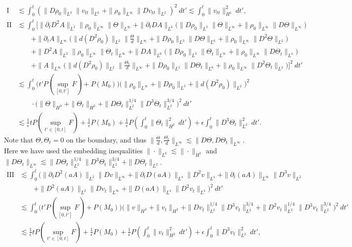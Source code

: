 \documentclass[12pt,a4paper]{amsart}
\numberwithin{equation}{section}
\theoremstyle{plain}
\theoremstyle{definition}
\begin{document}
\begin{align*}
\mathrm{I}&\lesssim \int_{0}^{t} (\|D\rho_0\|_{L^3}\|v_{tt}\|_{L^6}+\|\rho_0\|_{L^{\infty}}\|Dv_{tt}\|_{L^2})^2\ dt' \lesssim  \int_{0}^{t} \|v_{tt}\|_{H^1}^2\ dt',\\
\mathrm{II}&\lesssim \int_{0}^{t} \bigg[\|\partial_t D^2 A\|_{L^2} \|\rho_0\|_{L^{\infty}} \|\Theta\|_{ L^{\infty}}
 +\|\partial_t D A\|_{L^6}\Big(\|D\rho_0\|_{ L^3} \|\Theta\|_{L^{\infty}}+\|\rho_0\|_{L^{\infty}} \|D\Theta\|_{ L^{\infty}}\Big)\\
 &\qquad +\|\partial_t  A\|_{ L^{\infty}}\Big(\|d (D^2\rho_0)\|_{L^2} \|\frac{\Theta}{d}\|_{ L^{\infty}}+\|D\rho_0\|_{L^3} \|D\Theta\|_{L^6}+\|\rho_0\|_{L^{\infty}}\|D^2\Theta\|_{L^2}\Big)\\
&\qquad  +\|D^2A\|_{L^2} \|\rho_0\|_{L^{\infty}} \| \Theta_t\|_{ L^{\infty}}+ \|DA\|_{L^6}\Big( \| D\rho_0\|_{L^3} \|\Theta_t\|_{ L^{\infty}}+\|\rho_0\|_{ L^{\infty}} \|D\Theta_t\|_{ L^4}\Big)\\
&\qquad +\|  A\|_{ L^{\infty}}\Big(\|d (D^2\rho_0)\|_{L^2} \|\frac{\Theta_t}{d}\|_{ L^{\infty}}+\|D\rho_0\|_{L^3} \|D\Theta_t\|_{L^6}+\|\rho_0\|_{L^{\infty}}\|D^2\Theta_t\|_{L^2}\Big)\bigg]^2\ dt'\\
&\lesssim \int_{0}^{t} \Big( t'P(\sup\limits_{[0,t']}F)+P(M_0)  \Big)\Big(\|\rho_0\|_{L^{\infty}}+\|D\rho_0\|_{L^3}+\|d(D^2 \rho_0)\|_{L^2}\Big)^2\\
&\qquad\cdot\Big(\|\Theta\|_{H^3}+\|\Theta_t\|_{H^2}+\|D\Theta_t\|_{L^2}^{1/4}\|D^3\Theta_t\|_{L^2}^{3/4}\Big)^2 \ dt'\\
&\lesssim  \frac{1}{\epsilon}tP(\sup\limits_{t'\in[0,t]}F)+\frac{1}{\epsilon}P(M_0)+\frac{1}{\epsilon}P\left(\int_{0}^{t}\|\Theta_t\|_{H^2}^2 \ dt'\right)+\epsilon \int_{0}^{t}\|D^3\Theta_t\|_{L^2}^2 \ dt'.
\end{align*}
Note that $\Theta, \Theta_t=0$ on the boundary, and thus $\|\frac{\Theta}{d}, \frac{\Theta_t}{d}\|_{ L^{\infty}}\lesssim \|D\Theta, D\Theta_t\|_{ L^{\infty}}$. Here we have used the embedding inequalities $\|\cdot\|_{L^6}\lesssim \|\cdot\|_{H^1}$ and $\| D\Theta_t\|_{ L^{\infty}} \lesssim  \|D\Theta_t\|_{L^2}^{1/4}\|D^3\Theta_t\|_{L^2}^{3/4} +\|D\Theta_t\|_{L^2}$.
\begin{align*}
\mathrm{III}&\lesssim   
\int_{0}^{t}  \Big(\|\partial_t D^2(aA)\|_{L^2}\|Dv\|_{L^{\infty}}
+\|\partial_t D (aA)\|_{L^4}\|D^2 v\|_{L^4}
+\|\partial_t (aA)\|_{L^{\infty}}\|D^3 v\|_{L^2}\\
&\qquad
+\|D^2 (aA)\|_{L^2} \| Dv_t \|_{L^{\infty}}
+\|D(aA)\|_{L^4} \|D^2v_t\|_{L^4}\Big)^2 \ dt'\\
&\lesssim \int_{0}^{t} \Big( t'P(\sup\limits_{[0,t']}F)+P(M_0)  \Big)
\Big(\|v\|_{H^3}+\|v_t\|_{H^2}+\|Dv_t\|_{L^2}^{1/4}\|D^3v_t\|_{L^2}^{3/4}+\|D^2v_t\|_{L^2}^{1/4}\|D^3v_t\|_{L^2}^{3/4}\Big)^2 \ dt'\\
&\lesssim  \frac{1}{\epsilon}tP(\sup\limits_{t'\in[0,t]}F)+\frac{1}{\epsilon}P(M_0)+\frac{1}{\epsilon}P\left(\int_{0}^{t}\|v_t\|_{H^2}^2 \ dt'\right)+\epsilon \int_{0}^{t}\|D^3v_t\|_{L^2}^2 \ dt',
\end{align*}
\end{document}
